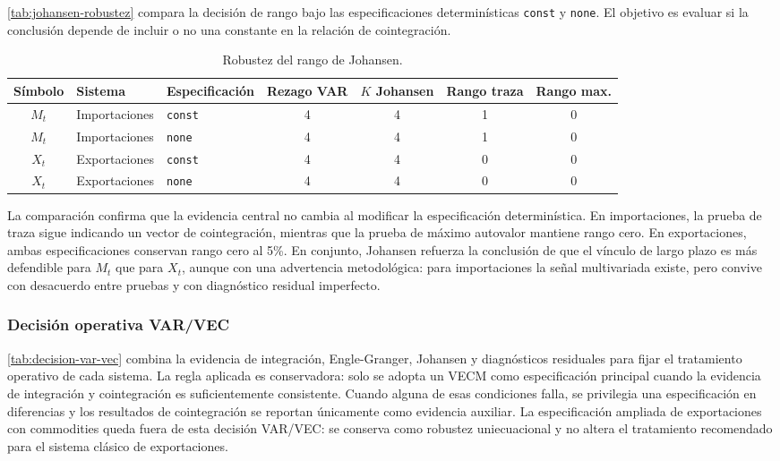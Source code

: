 \documentclass[11pt,a4paper]{article}
\begin{document}
	\autoref{tab:johansen-robustez} compara la decisión de rango bajo las
	especificaciones determinísticas \texttt{const} y \texttt{none}. El objetivo
	es evaluar si la conclusión depende de incluir o no una constante en la
	relación de cointegración.

	\begin{table}[H]
		\centering
		\caption{Robustez del rango de Johansen.}
		\label{tab:johansen-robustez}
		\small
		\begin{tabular}{cllcccc}
			\toprule
			Símbolo & Sistema & Especificación & Rezago VAR & \(K\) Johansen & Rango traza & Rango max. \\
			\midrule
			\(M_t\) & Importaciones & \texttt{const} & 4 & 4 & 1 & 0 \\
			\(M_t\) & Importaciones & \texttt{none} & 4 & 4 & 1 & 0 \\
			\(X_t\) & Exportaciones & \texttt{const} & 4 & 4 & 0 & 0 \\
			\(X_t\) & Exportaciones & \texttt{none} & 4 & 4 & 0 & 0 \\
			\bottomrule
		\end{tabular}
	\end{table}

	La comparación confirma que la evidencia central no cambia al modificar la
	especificación determinística. En importaciones, la prueba de traza sigue
	indicando un vector de cointegración, mientras que la prueba de máximo autovalor
	mantiene rango cero. En exportaciones, ambas especificaciones conservan rango
	cero al 5\%. En conjunto, Johansen refuerza la conclusión de que el vínculo de
	largo plazo es más defendible para \(M_t\) que para \(X_t\), aunque con una
	advertencia metodológica: para importaciones la señal multivariada existe, pero
	convive con desacuerdo entre pruebas y con diagnóstico residual imperfecto.

	\subsubsection{Decisión operativa VAR/VEC}
	\label{subsubsec:decision-var-vec}

	\autoref{tab:decision-var-vec} combina la evidencia de integración,
	Engle-Granger, Johansen y diagnósticos residuales para fijar el tratamiento
	operativo de cada sistema. La regla aplicada es conservadora: solo se adopta un
	VECM como especificación principal cuando la evidencia de integración y
	cointegración es suficientemente consistente. Cuando alguna de esas condiciones
	falla, se privilegia una especificación en diferencias y los resultados de
	cointegración se reportan únicamente como evidencia auxiliar. La especificación
	ampliada de exportaciones con commodities queda fuera de esta decisión VAR/VEC:
	se conserva como robustez uniecuacional y no altera el tratamiento recomendado
	para el sistema clásico de exportaciones.
\end{document}
